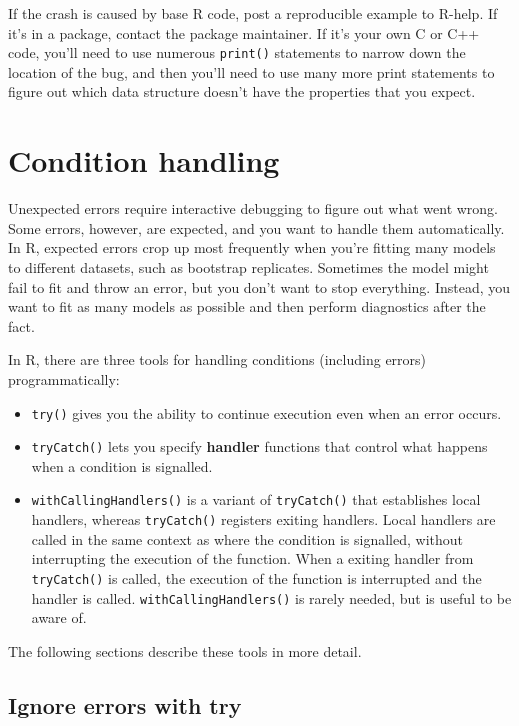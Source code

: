 \begin{itemize}
  If the crash is caused by base R code, post a reproducible example to
  R-help. If it's in a package, contact the package maintainer. If it's
  your own C or C++ code, you'll need to use numerous \texttt{print()}
  statements to narrow down the location of the bug, and then you'll
  need to use many more print statements to figure out which data
  structure doesn't have the properties that you expect.
\end{itemize}

\hypertarget{condition-handling}{%
\section{Condition handling}\label{condition-handling}}

Unexpected errors require interactive debugging to figure out what went
wrong. Some errors, however, are expected, and you want to handle them
automatically. In R, expected errors crop up most frequently when you're
fitting many models to different datasets, such as bootstrap replicates.
Sometimes the model might fail to fit and throw an error, but you don't
want to stop everything. Instead, you want to fit as many models as
possible and then perform diagnostics after the fact. 

In R, there are three tools for handling conditions (including errors)
programmatically:

\begin{itemize}
\item
  \texttt{try()} gives you the ability to continue execution even when
  an error occurs.
\item
  \texttt{tryCatch()} lets you specify \textbf{handler} functions that
  control what happens when a condition is signalled.
\item
  \texttt{withCallingHandlers()} is a variant of \texttt{tryCatch()}
  that establishes local handlers, whereas \texttt{tryCatch()} registers
  exiting handlers. Local handlers are called in the same context as
  where the condition is signalled, without interrupting the execution
  of the function. When a exiting handler from \texttt{tryCatch()} is
  called, the execution of the function is interrupted and the handler
  is called. \texttt{withCallingHandlers()} is rarely needed, but is
  useful to be aware of.
\end{itemize}

The following sections describe these tools in more detail.

\hypertarget{try}{%
\subsection{Ignore errors with try}\label{try}}

